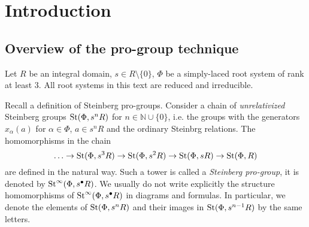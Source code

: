 \documentclass[oneside, 11pt]{amsart}
\begin{document}



\newcommand{\Set}{\mathbf{Set}}
\newcommand{\Group}{\mathbf{Grp}}
\newcommand{\Rng}{\mathbf{Rng}}
\newcommand{\Fun}{\mathbf{Fun}}
\newcommand{\Mod}{\mathbf{Mod}}
\newcommand{\op}{\mathrm{op}}
\newcommand{\ZZ}{\mathbb{Z}}

\newcommand{\otimeshat}{\mathbin{\widehat{\otimes}}}

\newcommand{\up}[2]{{^{#1}\!{#2}}}

\newcommand{\rA}{\mathsf{A}}
\newcommand{\rB}{\mathsf{B}}
\newcommand{\rC}{\mathsf{C}}
\newcommand{\rD}{\mathsf{D}}
\newcommand{\rE}{\mathsf{E}}
\newcommand{\rF}{\mathsf{F}}
\newcommand{\rG}{\mathsf{G}}

\newcommand{\catname}[1]{{\normalfont\textbf{#1}}} %

\section{Introduction}
\subsection{Overview of the pro-group technique}
Let $R$ be an integral domain, $s \in R \setminus \{0\}$, $\Phi$ be a simply-laced root system of rank at least $3$. All root systems in this text are reduced and irreducible.

Recall a definition of Steinberg pro-groups. Consider a chain of {\it unrelativized} Steinberg groups $\mathop{\mathrm{St}}\nolimits(\Phi, s^n R)$ for $n \in \mathbb N \cup \{0\}$, i.e. the groups with the generators $x_{\alpha}(a)$ for $\alpha \in \Phi$, $a \in s^n R$ and the ordinary Steinbrg relations. The homomorphisms in the chain
$$
\ldots \to \mathop{\mathrm{St}}\nolimits(\Phi, s^3 R) \to \mathop{\mathrm{St}}\nolimits(\Phi, s^2 R) \to \mathop{\mathrm{St}}\nolimits(\Phi, s R) \to \mathop{\mathrm{St}}\nolimits(\Phi, R)
$$
are defined in the natural way. Such a tower is called a {\it Steinberg pro-group}, it is denoted by $\mathop{\mathrm{St}}\nolimits^\infty(\Phi, s^\bullet R)$. We usually do not write explicitly the structure homomorphisms of $\mathop{\mathrm{St}}\nolimits^\infty(\Phi, s^\bullet R)$ in diagrams and formulas. In particular, we denote the elements of $\mathop{\mathrm{St}}\nolimits(\Phi, s^n R)$ and their images in $\mathop{\mathrm{St}}\nolimits(\Phi, s^{n - 1} R)$ by the same letters.
\end{document}
